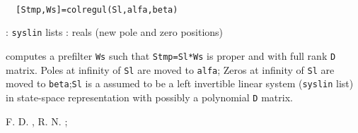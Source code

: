 %
% 
%



\begin{mandesc}
   \\ %
\end{mandesc}
\begin{calling_sequence}
\begin{verbatim}
  [Stmp,Ws]=colregul(Sl,alfa,beta)   
\end{verbatim}
\end{calling_sequence}
\begin{parameters}
  \begin{varlist}
    : \verb!syslin! lists
    : reals (new pole and zero positions)
  \end{varlist}
\end{parameters}
\begin{mandescription}
  computes a prefilter \verb!Ws! such that \verb!Stmp=Sl*Ws! is proper and 
  with full rank \verb!D! matrix.
  Poles at infinity of \verb!Sl! are moved to \verb!alfa!;
  Zeros at infinity of \verb!Sl! are moved to \verb!beta!;\verb!Sl! is a assumed to be a left invertible linear system (\verb!syslin! list)
  in state-space representation with possibly a polynomial \verb!D! matrix.
\end{mandescription}
\begin{manseealso}
       
\end{manseealso}
\begin{authors}
  F. D. , R. N. ;   
\end{authors}
